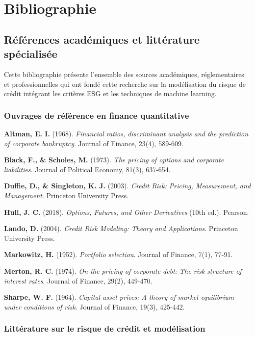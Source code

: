 \chapter{Bibliographie}

\section{Références académiques et littérature spécialisée}

Cette bibliographie présente l'ensemble des sources académiques, réglementaires et professionnelles qui ont fondé cette recherche sur la modélisation du risque de crédit intégrant les critères ESG et les techniques de machine learning.

\subsection{Ouvrages de référence en finance quantitative}

\textbf{Altman, E. I.} (1968). \textit{Financial ratios, discriminant analysis and the prediction of corporate bankruptcy}. Journal of Finance, 23(4), 589-609.

\textbf{Black, F., \& Scholes, M.} (1973). \textit{The pricing of options and corporate liabilities}. Journal of Political Economy, 81(3), 637-654.

\textbf{Duffie, D., \& Singleton, K. J.} (2003). \textit{Credit Risk: Pricing, Measurement, and Management}. Princeton University Press.

\textbf{Hull, J. C.} (2018). \textit{Options, Futures, and Other Derivatives} (10th ed.). Pearson.

\textbf{Lando, D.} (2004). \textit{Credit Risk Modeling: Theory and Applications}. Princeton University Press.

\textbf{Markowitz, H.} (1952). \textit{Portfolio selection}. Journal of Finance, 7(1), 77-91.

\textbf{Merton, R. C.} (1974). \textit{On the pricing of corporate debt: The risk structure of interest rates}. Journal of Finance, 29(2), 449-470.

\textbf{Sharpe, W. F.} (1964). \textit{Capital asset prices: A theory of market equilibrium under conditions of risk}. Journal of Finance, 19(3), 425-442.

\subsection{Littérature sur le risque de crédit et modélisation}

